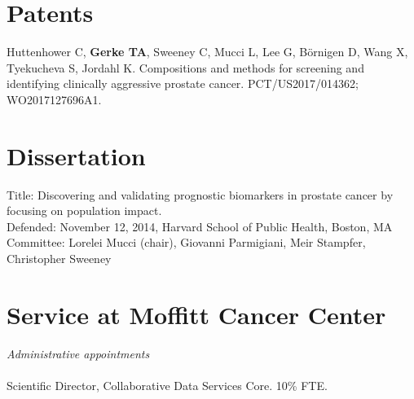 \documentclass[11pt, a4paper]{article} %
\newcommand{\years}[1]{\marginnote{\scriptsize \raise .3ex\hbox{#1}}} %
\begin{document}

\section*{Patents}
\years{2017} Huttenhower C, {\bf Gerke TA}, Sweeney C, Mucci L, Lee G, B\"{o}rnigen D, Wang X, Tyekucheva S, Jordahl K. Compositions and methods for screening and identifying clinically aggressive prostate cancer. 
PCT/US2017/014362; WO2017127696A1. 

\section*{Dissertation}
Title: Discovering and validating prognostic biomarkers in prostate cancer by focusing on population impact. \\
Defended: November 12, 2014, Harvard School of Public Health, Boston, MA\\
Committee: Lorelei Mucci (chair), Giovanni Parmigiani, Meir Stampfer, Christopher Sweeney

\section*{Service at Moffitt Cancer Center}
\emph{Administrative appointments}\\
~\\
\years{2018--}Scientific Director, Collaborative Data Services Core. 10\% FTE.\\
\end{document}
